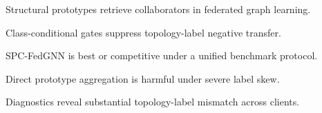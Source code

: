 \begin{highlights}
\item Structural prototypes retrieve collaborators in federated graph learning.
\item Class-conditional gates suppress topology-label negative transfer.
\item SPC-FedGNN is best or competitive under a unified benchmark protocol.
\item Direct prototype aggregation is harmful under severe label skew.
\item Diagnostics reveal substantial topology-label mismatch across clients.
\end{highlights}
